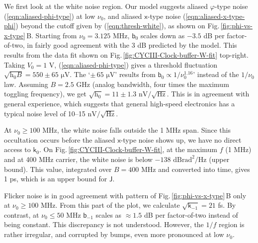 \documentclass{article}
\newcommand{\unit}[1]{\ensuremath{\mathrm{#1}}}
\newcommand{\req}[1]{(\ref{#1})}
\begin{document}
We first look at the white noise region.  Our model suggests aliased $\varphi$-type noise \req{eqn:aliased-phi-type} at low $\nu_0$, and aliased $\mathsf{x}$-type noise \req{eqn:aliased-x-type-phi} beyond the cutoff given by \req{eqn:thresh-white}, as shown on Fig.\,\ref{fig:phi-vs-x-type}\,B\@.
Starting from $\nu_0=3.125$ MHz, $\mathsf{b}_0$ scales down as $-3.5$ dB per factor-of-two, in fairly good agreement with the 3 dB predicted by the model.  This results from  
the data fit shown on Fig.\,\ref{fig:CYCIII-Clock-buffer-W-fit} top-right.
Taking $V_0=1$ V, \req{eqn:aliased-phi-type} gives a threshold fluctuation $\sqrt{\mathrm{h}_0B}=550\pm65$ \unit{\mu V}.  The `$\pm\,65$ \unit{\mu V}' results from $\mathsf{b}_0\propto1/\nu_0^{1.16}$' instead of the $1/\nu_0$ law.
Assuming $B=2.5$ GHz (analog bandwidth, four times the maximum toggling frequency), we get $\sqrt{\mathrm{h}_0}=11\pm1.3$ \unit{nV/\sqrt{Hz}}.  This is in agreement with general experience, which suggests that general high-speed electronics has a typical noise level of 10--15 \unit{nV/\sqrt{Hz}}.

At $\nu_0\ge100$ MHz, the white noise falls outside the 1 MHz span.  Since this occultation occurs before the aliased $\mathsf{x}$-type noise shows up, we have no direct access to $\mathsf{k}_0$.  
On Fig.\,\ref{fig:CYCIII-Clock-buffer-W-fit}, at the maximum $f$ (1 MHz) and at 400 MHz carrier, the white noise is below $-138$ \unit{dBrad^2/Hz} (upper bound).  This value, integrated over $B=400$ MHz and converted into time, gives 1 ps, which is an upper bound for $\mathsf{J}$.




Flicker noise is in good agreement with pattern of Fig.\,\ref{fig:phi-vs-x-type}\,B only at $\nu_0\ge100$ MHz.  From this part of the plot, we calculate $\sqrt{\textsf{k}_{-1}}=21$ fs.
By contrast, at $\nu_0\le50$ MHz $\mathsf{b}_{-1}$ scales as $\approx1.5$ dB per factor-of-two instead of being constant.  This discrepancy is not understood.  However, the $1/f$ region is rather irregular, and corrupted by bumps, even more pronounced at low $\nu_0$.
\end{document}

